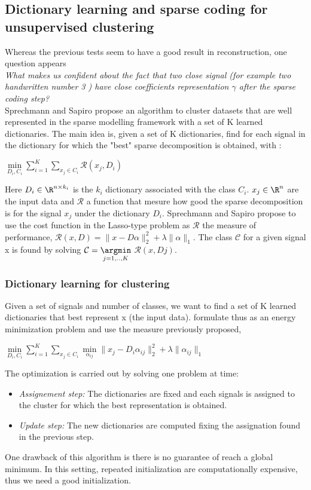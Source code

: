 \subsection{Dictionary learning and sparse coding for unsupervised clustering}
\label{sec:Clustering}
Whereas the previous tests seem to have a good result in reconstruction, one question appears \\ \textit{What makes us confident about the fact that two close signal (for example two handwritten number 3 ) have close coefficients representation $\gamma$  after the sparse coding step?}\\
Sprechmann and Sapiro \cite{5494985} propose an algorithm to cluster datasets that are well represented in the sparse modelling framework with a set of K learned dictionaries. The main idea is, given a set of K dictionaries, find for each signal in the dictionary for which the "best" sparse decomposition is obtained, with :

\begin{center}
$\underset{D_i,C_i}{\min} \sum_{i=1}^{K} \sum_{x_j \in C_i} \mathcal{R}(x_j, D_i)$
 
\end{center}
Here $D_i \in \R^{n \times k_i}$ is the $k_i$ dictionary associated with the class $C_i$. $x_j \in \R^n$ are the input data and $\mathcal{R}$  a function that mesure how good the sparse decomposition is for the signal $x_j$ under the dictionary $D_i$. Sprechmann and Sapiro propose to use the cost function in the Lasso-type problem as $\mathcal{R}$ the measure of performance, $\mathcal{R}(x,D) = \|x - D\alpha\|^2_2 + \lambda \|\alpha\|_1$. The class $\mathcal{C}$ for a given signal x is found by solving $\mathcal{C}= \underset{j=1,..,K}{\argmin}$ $ \mathcal{R}(x,Dj) $.

\subsubsection{Dictionary learning for clustering}
Given a set of signals and number of classes, we want to find a set of K learned dictionaries that best represent x (the input data). \cite{5494985} formulate thus as an energy minimization problem and use the measure previously proposed,\\
\begin{center}
 $\underset{D_i,C_i}{\min} \sum_{i=1}^{K} \sum_{x_j \in C_i} \underset{\alpha_{ij}}{\min}\|x_j - D_i \alpha_{ij}\|^2_2 + \lambda\|\alpha_{ij}\|_1$
\end{center}
The optimization is carried out by solving one problem at time:
\begin{itemize}
 \item \textit{Assignement step:} The dictionaries are fixed and each signals is assigned to the cluster for which the best representation is obtained.
 \item \textit{Update step:} The new dictionaries are computed fixing the assignation found in the previous step.
\end{itemize}
One drawback of this algorithm is there is no guarantee of reach a global minimum. In this setting, repeated initialization are computationally expensive, thus we need a good initialization.

